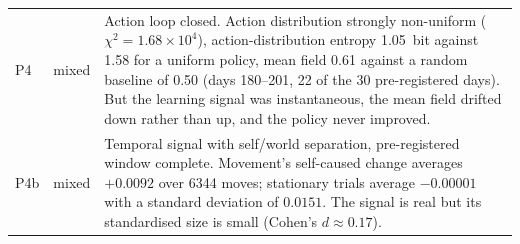 \documentclass[11pt]{article}
\begin{document}
\begin{table}[h]
\begin{tabular}{@{}lL{1.5cm}L{7.7cm}@{}}
P4 & mixed & Action loop closed. Action distribution strongly non-uniform ($\chi^2=1.68\times10^4$), action-distribution entropy 1.05~bit against 1.58 for a uniform policy, mean field 0.61 against a random baseline of 0.50 (days 180--201, 22 of the 30 pre-registered days). But the learning signal was instantaneous, the mean field drifted down rather than up, and the policy never improved. \\
P4b & mixed & Temporal signal with self/world separation, pre-registered window complete. Movement's self-caused change averages $+0.0092$ over 6344 moves; stationary trials average $-0.00001$ with a standard deviation of $0.0151$. The signal is real but its standardised size is small (Cohen's $d\approx0.17$). \\
\bottomrule
\end{tabular}
\end{table}
\end{document}
